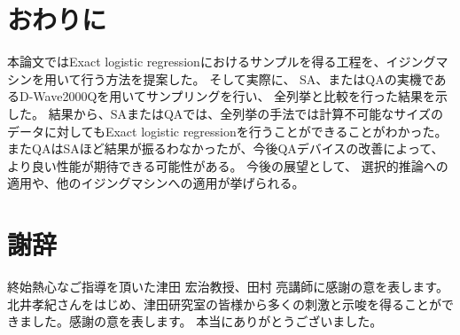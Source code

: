 \documentclass[12pt, dvipdfmx]{jmaster}
\theoremstyle{definition}
\begin{document}
\chapter{おわりに}
\label{sec:cncls}
本論文では\textup{Exact logistic regression}におけるサンプルを得る工程を、イジングマシンを用いて行う方法を提案した。
そして実際に、 SA、またはQAの実機であるD-Wave2000Qを用いてサンプリングを行い、 全列挙と比較を行った結果を示した。
結果から、SAまたはQAでは、全列挙の手法では計算不可能なサイズのデータに対してもExact logistic regressionを行うことができることがわかった。
またQAはSAほど結果が振るわなかったが、今後QAデバイスの改善によって、より良い性能が期待できる可能性がある。
今後の展望として、 選択的推論への適用や、他のイジングマシンへの適用が挙げられる。

\chapter*{謝辞}
\label{sec:syazi}
終始熱心なご指導を頂いた津田 宏治教授、田村 亮講師に感謝の意を表します。
北井孝紀さんをはじめ、津田研究室の皆様から多くの刺激と示唆を得ることができました。感謝の意を表します。
本当にありがとうございました。



\end{document}
